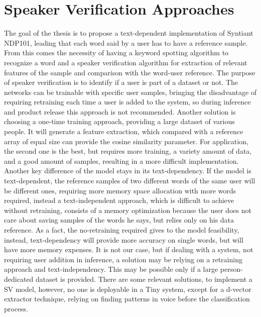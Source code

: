 \section{Speaker Verification Approaches}
\label{subsec:sv approaches}
The goal of the thesis is to propose a text-dependent implementation of Syntiant NDP101, leading that each word said by a user has to have a reference sample. From this comes the necessity of having a keyword spotting algorithm to recognize a word and a speaker verification algorithm for extraction of relevant features of the sample and comparison with the word-user reference.\newline\newline
The purpose of speaker verification is to identify if a user is part of a dataset or not. The networks can be trainable with specific user samples, bringing the disadvantage of requiring retraining each time a user is added to the system, so during inference and product release this approach is not recommended. Another solution is choosing a one-time training approach, providing a large dataset of various people. It will generate a feature extraction, which compared with a reference array of equal size can provide the cosine similarity parameter. For application, the second one is the best, but requires more training, a variety amount of data, and a good amount of samples, resulting in a more difficult implementation. Another key difference of the model stays in its text-dependency. If the model is text-dependent, the reference samples of two different words of the same user will be different ones, requiring more memory space allocation with more words required, instead a text-independent approach, which is difficult to achieve without retraining, consists of a memory optimization because the user does not care about saving samples of the words he says, but relies only on his data reference. As a fact, the no-retraining required gives to the model feasibility, instead, text-dependency will provide more accuracy on single words, but will have more memory expenses. It is not our case, but if dealing with a system, not requiring user addition in inference, a solution may be relying on a retraining approach and text-independency. This may be possible only if a large person-dedicated dataset is provided. There are some relevant solutions, to implement a SV model, however, no one is deployable in a Tiny system, except for a d-vector extractor technique, relying on finding patterns in voice before the classification process.\cite{dvector_extractor_TinySV}\newline 

